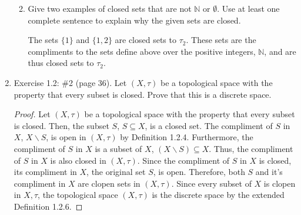 \documentclass[a4paper, 12pt]{config/homework}
\begin{document}
\begin{enumerate}
\begin{enumerate}[label=\alph*.]
\bigskip
\item Give two examples of closed sets that are not \(\mathbb{N}\) or \(\emptyset\). Use at least one complete sentence to explain why the given sets are closed.

The sets \(\{1\}\) and \(\{1, 2\}\) are closed sets to \(\tau_2\). These sets are the compliments to the sets define above over the positive integers, \(\mathbb{N}\), and are thus closed sets to \(\tau_2\).

\end{enumerate}
\pagebreak
\item Exercise 1.2: \#2 (page 36). Let \((X,\tau)\) be a topological space with the property that every subset is closed. Prove that this is a discrete space.

\begin{proof}
Let \((X,\tau)\) be a topological space with the property that every subset is closed. Then, the subset \(S\), \(S\subseteq X\), is a closed set. The compliment of \(S\) in \(X\), \(X \backslash S\), is open in \((X,\tau)\) by Definition 1.2.4. Furthermore, the compliment of \(S\) in \(X\) is a subset of \(X\), \((X\backslash S)\subseteq X\). Thus, the compliment of \(S\) in \(X\) is also closed in \((X,\tau)\). Since the compliment of \(S\) in \(X\) is closed, its compliment in \(X\), the original set \(S\), is open. Therefore, both \(S\) and it's compliment in \(X\) are clopen sets in \((X,\tau)\). Since every subset of \(X\) is clopen in \(X,\tau\), the topological space \((X,\tau)\) is the discrete space by the extended Definition 1.2.6.
\end{proof}

\end{enumerate}
\end{document}
